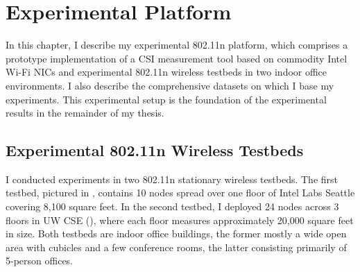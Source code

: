 \ifx\mainfile\undefined

\setcounter{chapter}{4} %
\fi

\cleardoublepage
\chapter{Experimental Platform}
\label{chap:tool}

In this chapter, I describe my experimental 802.11n platform, which comprises a prototype implementation of a CSI measurement tool based on commodity Intel Wi-Fi NICs and experimental 802.11n wireless testbeds in two indoor office environments. I also describe the comprehensive datasets on which I base my experiments. This experimental setup is the foundation of the experimental results in the remainder of my thesis.

\section{Experimental 802.11n Wireless Testbeds}
I conducted experiments in two 802.11n stationary wireless testbeds. The first testbed, pictured in , contains 10 nodes spread over one floor of Intel Labs Seattle covering 8,100 square feet. In the second testbed, I deployed 24 nodes across 3 floors in UW CSE (), where each floor measures approximately 20,000 square feet in size. Both testbeds are indoor office buildings, the former mostly a wide open area with cubicles and a few conference rooms, the latter consisting primarily of 5-person offices.

